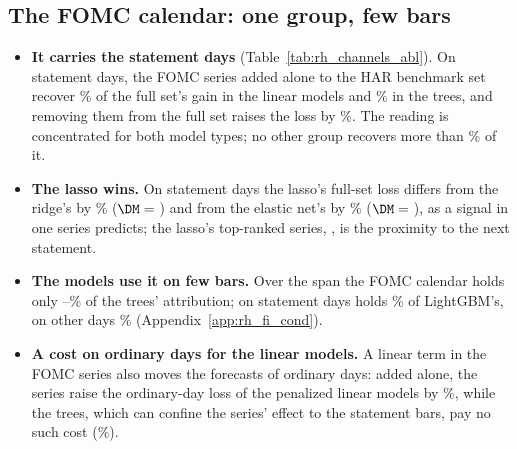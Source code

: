\subsection{The FOMC calendar: one group, few bars}
\label{sec:rh_fi_event}
\begin{itemize}
\item \textbf{It carries the statement days} (Table~\ref{tab:rh_channels_abl}). On statement days, the FOMC series
  added alone to the HAR benchmark set recover \% of the full set's gain in the
  linear models and \% in the trees, and removing them from the full set raises the
  loss by \%. The reading is concentrated for both model types; no other group recovers
  more than \% of it.
\item \textbf{The lasso wins.} On statement days the lasso's full-set loss differs from the ridge's by
  \rhchLassoRidgeEventPct\% ($\DM={}$\rhchLassoRidgeEventDm) and from the elastic net's by \rhchLassoEnetEventPct\%
  ($\DM={}$\rhchLassoEnetEventDm), as a signal in one series predicts; the lasso's top-ranked series, \rhldLassoTopOne,
  is the proximity to the next statement.
\item \textbf{The models use it on few bars.} Over the span the FOMC calendar holds only
  \rhfipFomcBucketMin--\rhfipFomcBucketMax\% of the trees' attribution; on statement days \rhfipFomcUntil{} holds
  \rhfipLgbmUntilFomc\% of LightGBM's, on other days \rhfipLgbmUntilOther\% (Appendix~\ref{app:rh_fi_cond}).
\item \textbf{A cost on ordinary days for the linear models.} A linear term in the FOMC series also moves the forecasts
  of ordinary days: added alone, the series raise the ordinary-day loss of the penalized linear models by
  \%, while the trees, which can confine the series' effect to the statement bars, pay
  no such cost (\%).
\end{itemize}

